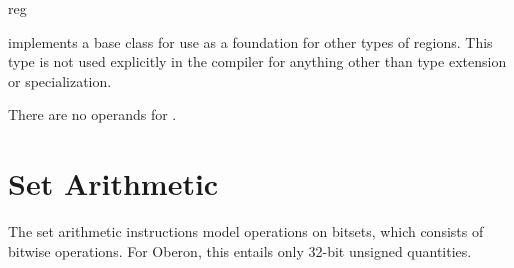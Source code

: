 \begin{instruction}{reg}

  \begin{notes}
     implements a base class for use as a foundation for
    other types of regions.  This type is not used explicitly in the
    compiler for anything other than type extension or specialization.
  \end{notes}

  \nresults

  \begin{operands}
  \item There are no operands for .
  \end{operands}

  \begin{seealso}
  \end{seealso}
\end{instruction}



\section{Set Arithmetic}\label{class:set-arithmetic}

The set arithmetic instructions model operations on bitsets, which
consists of bitwise operations.  For Oberon, this entails only 32-bit
unsigned quantities.

